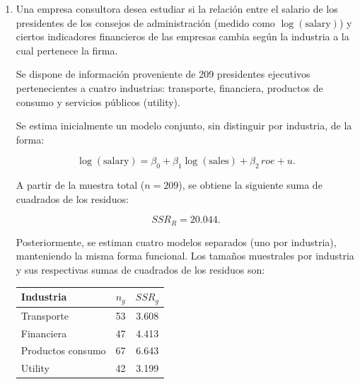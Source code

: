 \documentclass[10pt,a4paper]{article}
\begin{document}
\begin{enumerate}
\[
IC_{95\%}(\beta_2)
=
\hat{\beta}_2 \pm z_{0.975}\,\text{s.e.}(\hat{\beta}_2),
\]

donde \(z_{0.975} = 1.96\).

De la matriz de varianzas y covarianzas del Modelo 2 se obtiene:

\[
\text{Var}(\hat{\beta}_2) = 0.0100
\quad \Rightarrow \quad
\text{s.e.}(\hat{\beta}_2) = \sqrt{0.0100} = 0.10.
\]

Dado que \(\hat{\beta}_2 = 0.55\), el intervalo de confianza es:

\[
IC_{95\%}(\beta_2)
=
0.55 \pm 1.96(0.10)
=
0.55 \pm 0.196.
\]

Por lo tanto,

\[
IC_{95\%}(\beta_2) = [0.354,\; 0.746].
\]

\textbf{Interpretación:}

Con un \(95\%\) de confianza, un aumento de una unidad en el tráfico
(vuelos por hora) incrementa el retraso de salida entre \(0.35\) y
\(0.75\) minutos. Dado que el intervalo no contiene al cero, el efecto del
tráfico es estadísticamente significativo al \(5\%\).


\color{black}
\newpage
    \item  Una empresa consultora desea estudiar si la relación entre el salario de los presidentes de los 
consejos de administración (medido como $\log(\text{salary})$) y ciertos indicadores financieros 
de las empresas cambia según la industria a la cual pertenece la firma.

Se dispone de información proveniente de 209 presidentes ejecutivos pertenecientes a cuatro 
industrias: transporte, financiera, productos de consumo y servicios públicos (utility).

Se estima inicialmente un modelo conjunto, sin distinguir por industria, de la forma:

\[
\log(\text{salary}) = \beta_0 + \beta_1 \log(\text{sales}) + \beta_2 \, roe + u.
\]

A partir de la muestra total ($n = 209$), se obtiene la siguiente suma de cuadrados de los residuos:

\[
SSR_R = 20.044.
\]

Posteriormente, se estiman cuatro modelos separados (uno por industria), manteniendo la misma 
forma funcional. Los tamaños muestrales por industria y sus respectivas sumas de cuadrados de los 
residuos son:

\begin{center}
\begin{tabular}{lcc}
\toprule
\textbf{Industria} & $n_g$ & $SSR_g$ \\
\midrule
Transporte        & 53 & 3.608 \\
Financiera        & 47 & 4.413 \\
Productos consumo & 67 & 6.643 \\
Utility           & 42 & 3.199 \\


\end{tabular}
\end{center}
\end{enumerate}
\end{document}

